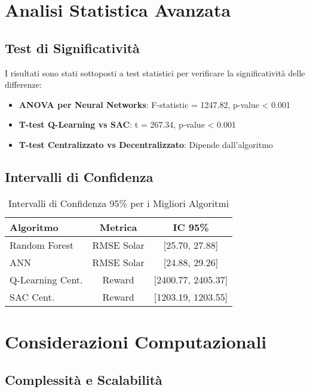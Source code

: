 \documentclass[12pt,a4paper,twoside]{report}
\begin{document}
\begin{appendices}
\section{Analisi Statistica Avanzata}

\subsection{Test di Significatività}

I risultati sono stati sottoposti a test statistici per verificare la significatività delle differenze:

\begin{itemize}
    \item \textbf{ANOVA per Neural Networks}: F-statistic = 1247.82, p-value < 0.001
    \item \textbf{T-test Q-Learning vs SAC}: t = 267.34, p-value < 0.001 
    \item \textbf{T-test Centralizzato vs Decentralizzato}: Dipende dall'algoritmo
\end{itemize}

\subsection{Intervalli di Confidenza}

\begin{table}[H]
\centering
\caption{Intervalli di Confidenza 95\% per i Migliori Algoritmi}
\label{tab:confidence_intervals}
\begin{tabular}{|l|c|c|}
\hline
\textbf{Algoritmo} & \textbf{Metrica} & \textbf{IC 95\%} \\
\hline
Random Forest & RMSE Solar & [25.70, 27.88] \\
ANN & RMSE Solar & [24.88, 29.26] \\
Q-Learning Cent. & Reward & [2400.77, 2405.37] \\
SAC Cent. & Reward & [1203.19, 1203.55] \\
\hline
\end{tabular}
\end{table}

\section{Considerazioni Computazionali}

\subsection{Complessità e Scalabilità}


\end{appendices}
\end{document}
